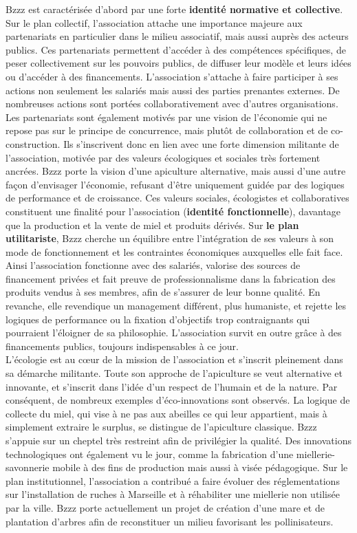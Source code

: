         Bzzz est caractérisée d’abord par une forte \textbf{identité normative et collective}. Sur le plan collectif, l’association attache une importance majeure aux partenariats en particulier dans le milieu associatif, mais aussi auprès des acteurs publics. Ces partenariats permettent d’accéder à des compétences spécifiques, de peser collectivement sur les pouvoirs publics, de diffuser leur modèle et leurs idées ou d’accéder à des financements. L’association s’attache à faire participer à ses actions non seulement les salariés mais aussi des parties prenantes externes. De nombreuses actions sont portées collaborativement avec d’autres organisations. Les partenariats sont également motivés par une vision de l’économie qui ne repose pas sur le principe de concurrence, mais plutôt de collaboration et de co-construction. Ils s’inscrivent donc en lien avec une forte dimension militante de l’association, motivée par des valeurs écologiques et sociales très fortement ancrées. Bzzz porte la vision d’une apiculture alternative, mais aussi d’une autre façon d’envisager l’économie, refusant d’être uniquement guidée par des logiques de performance et de croissance. Ces valeurs sociales, écologistes et collaboratives constituent une finalité pour l'association (\textbf{identité fonctionnelle}), davantage que la production et la vente de miel et produits dérivés. Sur \textbf{le plan utilitariste},  Bzzz cherche un équilibre entre l’intégration de ses valeurs à son mode de fonctionnement et les contraintes économiques auxquelles elle fait face. Ainsi l’association fonctionne avec des salariés, valorise des sources de financement privées et fait preuve de professionnalisme dans la fabrication des produits vendus à ses membres, afin de s’assurer de leur bonne qualité. En revanche, elle revendique un management différent, plus humaniste, et rejette les logiques de performance ou la fixation d’objectifs trop contraignants qui pourraient l’éloigner de sa philosophie. L’association survit en outre grâce à des financements publics, toujours indispensables à ce jour. \\


        L’écologie est au cœur de la mission de l’association et s’inscrit pleinement dans sa démarche militante. Toute son approche de l’apiculture se veut alternative et innovante, et s’inscrit dans l’idée d’un respect de l’humain et de la nature. Par conséquent, de nombreux exemples d’éco-innovations sont observés. La logique de collecte du miel, qui vise à ne pas  aux abeilles ce qui leur appartient, mais à simplement extraire le surplus, se distingue de l’apiculture classique. Bzzz s’appuie sur un cheptel très restreint afin de privilégier la qualité. Des innovations technologiques ont également vu le jour, comme la fabrication d’une miellerie-savonnerie mobile à des fins de production mais aussi à visée pédagogique. Sur le plan institutionnel, l’association a contribué a faire évoluer des réglementations sur l’installation de ruches à Marseille et à réhabiliter une miellerie non utilisée par la ville. Bzzz porte actuellement un projet de création d’une mare et de plantation d’arbres afin de reconstituer un milieu favorisant les pollinisateurs.

